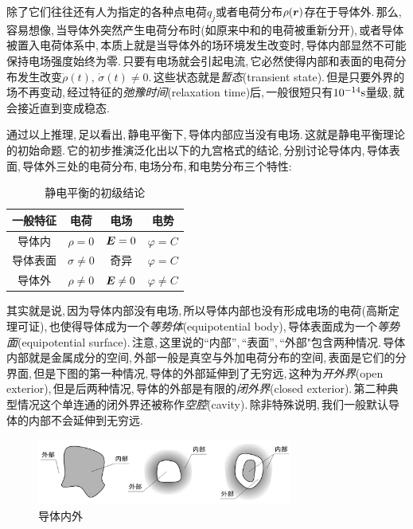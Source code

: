 除了它们往往还有人为指定的各种点电荷$q_j$或者电荷分布$\rho(\boldsymbol{r})$存在于导体外.\,那么,\,容易想像,\,当导体外突然产生电荷分布时(如原来中和的电荷被重新分开),\,或者导体被置入电荷体系中,\,本质上就是当导体外的场环境发生改变时,\,导体内部显然不可能保持电场强度始终为零.\,只要有电场就会引起电流,\,它必然使得内部和表面的电荷分布发生改变$\dot{\rho}(t),\,\dot{\sigma}(t)\neq 0$.\,这些状态就是\emph{暂态}(transient state).\,但是只要外界的场不再变动,\,经过特征的\emph{弛豫时间}(relaxation time)后,\,一般很短只有$10^{-14}{\rm s}$量级,\,就会接近直到变成稳态.

通过以上推理,\,足以看出,\,静电平衡下,\,导体内部应当没有电场.\,这就是静电平衡理论的初始命题.\,它的初步推演泛化出以下的九宫格式的结论,\,分别讨论导体内,\,导体表面,\,导体外三处的电荷分布,\,电场分布,\,和电势分布三个特性:

\begin{table}[H]
\centering
\begin{tabular}{|c||c|c|c|}
\hline
一般特征	&电荷		  		&电场&电势\\
\hline\hline
导体内 		&$\rho = 0$			&$\boldsymbol{E} = 0$	&$\varphi=C$\\
\hline
导体表面	&$\sigma\neq 0$ 	&奇异			&$\varphi=C$\\
\hline
导体外 		&$\rho \neq 0$ 	&$\boldsymbol{E} \neq 0$&$\varphi\neq C$\\
\hline
\end{tabular}
\caption{静电平衡的初级结论}
\end{table}

其实就是说,\,因为导体内部没有电场,\,所以导体内部也没有形成电场的电荷(高斯定理可证),\,也使得导体成为一个\emph{等势体}(equipotential body),\,导体表面成为一个\emph{等势面}(equipotential surface).\,注意,\,这里说的``内部'',\,``表面'',\,``外部"包含两种情况.\,导体内部就是金属成分的空间,\,外部一般是真空与外加电荷分布的空间,\,表面是它们的分界面,\,但是下图的第一种情况,\,导体的外部延伸到了无穷远,\,这种为\emph{开外界}(open exterior),\,但是后两种情况,\,导体的外部是有限的\emph{闭外界}(closed exterior).\,第二种典型情况这个单连通的闭外界还被称作\emph{空腔}(cavity).\,除非特殊说明,\,我们一般默认导体的内部不会延伸到无穷远.

\begin{figure}[H]
\centering
\includegraphics[width=0.75\textwidth]{image/7-2-2.png}
\caption{导体内外}
\end{figure}

